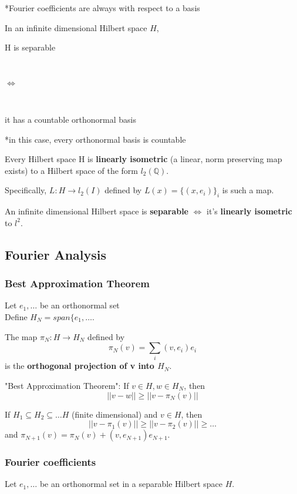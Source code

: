 \documentclass[a4paper, 12pt]{article}
\def\Q{\ensuremath{\mathbb{Q}}}
\newcommand{\bt}[1]{\textbf{#1}} %
\newcommand{\gray}[1]{{\leavevmode\color[gray]{0.5}{#1}}} %
\begin{document}
\begin{multicols}{2}
*Fourier coefficients are always with respect to a basis

In an infinite dimensional Hilbert space $H$,  \\
\centerline{H is separable} \\
\centerline{$\iff$}  \\
\centerline{it has a countable orthonormal basis}

*in this case, every orthonormal basis is countable \\
\gray{"if one then all"}


Every Hilbert space H is \bt{linearly isometric} (a linear, norm preserving map exists)
to a Hilbert space of the form $l_2(\Q)$.

Specifically, $L: H \rightarrow l_2(I)$ defined by $L(x) = \{(x, e_i)\}_i$ is such a map.


An infinite dimensional Hilbert space is \bt{separable} $\iff$ it's \bt{linearly isometric} to $l^2$.

\subsection{Fourier Analysis}

\subsubsection{Best Approximation Theorem}

Let $e_1, \dots$ be an orthonormal set 
\gray{(not necessarily a basis)} \\
Define $H_N = span \{e_1, \dots$. 

The map $\pi_N: H \rightarrow H_N$ defined by 
$$\pi_N(v) = \sum_{i} (v, e_i) e_i$$
is the \bt{orthogonal projection of v into $H_N$}.

"Best Approximation Theorem": If $v \in H, w \in H_N$, then 
$$|| v - w || \geq || v - \pi_N(v) ||$$
\gray{"$\phi_N(v)$ is the unique closest point to v in $H_N$"}

If $H_1 \subseteq H_2 \subseteq \dots H$ (finite dimensional) and $v \in H$, 
then 
$$|| v - \pi_1(v) || \geq || v - \pi_2(v) || \geq \dots$$
and 
$\pi_{N+1}(v) = \pi_N(v) + (v, e_{N+1})e_{N+1}$.


\subsubsection{Fourier coefficients}

Let $e_1, \dots$ be an orthonormal set in a separable Hilbert space $H$.


\end{multicols}
\end{document}
